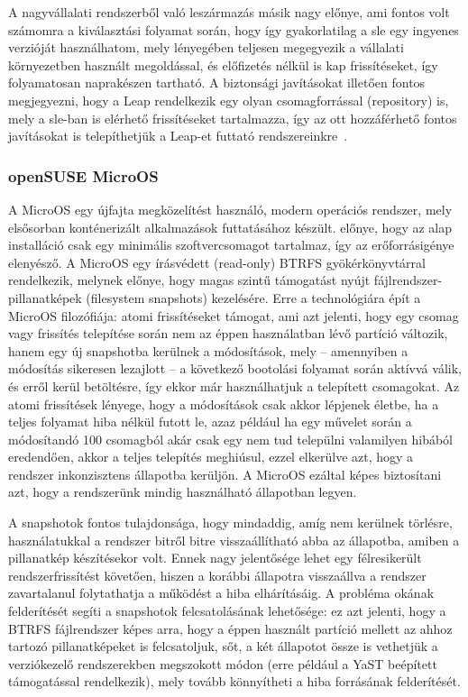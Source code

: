 A nagyvállalati rendszerből való leszármazás másik nagy előnye, ami fontos volt számomra a kiválasztási folyamat során, hogy így gyakorlatilag a \acrlong{sle} egy ingyenes verzióját használhatom, mely lényegében teljesen megegyezik a vállalati környezetben használt megoldással, és előfizetés nélkül is kap frissítéseket, így folyamatosan naprakészen tartható. A biztonsági javításokat illetően fontos megjegyezni, hogy a Leap rendelkezik egy olyan csomagforrással (repository) is, mely a \acrlong{sle}-ban is elérhető frissítéseket tartalmazza, így az ott hozzáférhető fontos javításokat is telepíthetjük a Leap-et futtató rendszereinkre~\cite{openSUSELeapSLERepo}.

\subsubsection{openSUSE MicroOS}
A MicroOS egy újfajta megközelítést használó, modern operációs rendszer, mely elsősorban konténerizált alkalmazások futtatásához készült.  előnye, hogy az alap installáció csak egy minimális szoftvercsomagot tartalmaz, így az erőforrásigénye elenyésző. A MicroOS egy írásvédett (read-only) BTRFS gyökérkönyvtárral rendelkezik, melynek előnye, hogy magas szintű támogatást nyújt fájlrendszer-pillanatképek (filesystem snapshots) kezelésére.
Erre a technológiára épít a MicroOS filozófiája: atomi frissítéseket támogat, ami azt jelenti, hogy egy csomag vagy frissítés telepítése során nem az éppen használatban lévő partíció változik, hanem egy új snapshotba kerülnek a módosítások, mely -- amennyiben a módosítás sikeresen lezajlott -- a következő bootolási folyamat során aktívvá válik, és  erről kerül betöltésre, így ekkor már használhatjuk a telepített csomagokat. Az atomi frissítések lényege, hogy a módosítások csak akkor lépjenek életbe, ha a teljes folyamat hiba nélkül futott le, azaz például ha egy művelet során a módosítandó 100 csomagból akár csak egy nem tud települni valamilyen hibából eredendően, akkor a teljes telepítés meghiúsul, ezzel elkerülve azt, hogy a rendszer inkonzisztens állapotba kerüljön. A MicroOS ezáltal képes biztosítani azt, hogy a rendszerünk mindig használható állapotban legyen.

A snapshotok fontos tulajdonsága, hogy mindaddig, amíg nem kerülnek törlésre, használatukkal a rendszer bitről bitre visszaállítható abba az állapotba, amiben a pillanatkép készítésekor volt. Ennek nagy jelentősége lehet egy félresikerült rendszerfrissítést követően, hiszen a korábbi állapotra visszaállva a rendszer zavartalanul folytathatja a működést a hiba elhárításáig.
A probléma okának felderítését segíti a snapshotok felcsatolásának lehetősége: ez azt jelenti, hogy a BTRFS fájlrendszer képes arra, hogy a éppen használt partíció mellett az ahhoz tartozó pillanatképeket is felcsatoljuk, sőt, a két állapotot össze is vethetjük a verziókezelő rendszerekben megszokott módon (erre például a YaST beépített támogatással rendelkezik), mely tovább könnyítheti a hiba forrásának felderítését.

